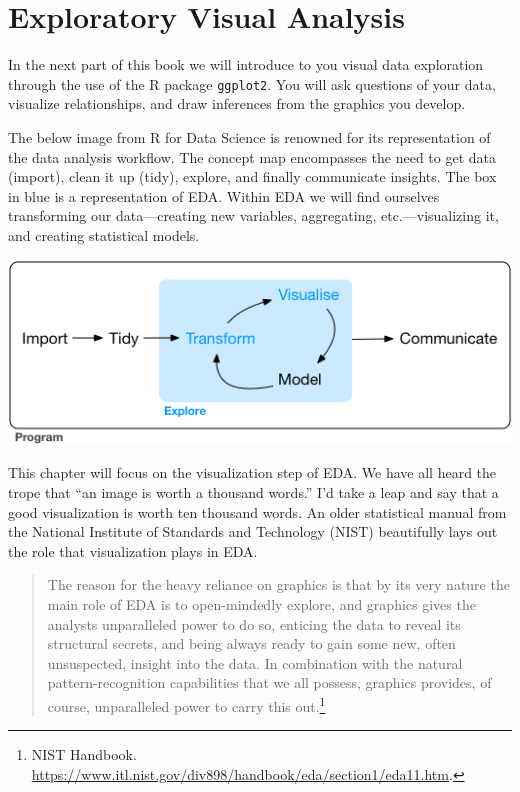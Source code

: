 \documentclass[
]{book}
\begin{document}
\hypertarget{exploratory-visual-analysis}{%
\chapter{Exploratory Visual Analysis}\label{exploratory-visual-analysis}}

In the next part of this book we will introduce to you visual data exploration through the use of the R package \texttt{ggplot2}. You will ask questions of your data, visualize relationships, and draw inferences from the graphics you develop.

The below image from R for Data Science is renowned for its representation of the data analysis workflow. The concept map encompasses the need to get data (import), clean it up (tidy), explore, and finally communicate insights. The box in blue is a representation of EDA. Within EDA we will find ourselves transforming our data---creating new variables, aggregating, etc.---visualizing it, and creating statistical models.

\includegraphics{static/data-science-explore.png}

This chapter will focus on the visualization step of EDA. We have all heard the trope that ``an image is worth a thousand words.'' I'd take a leap and say that a good visualization is worth ten thousand words. An older statistical manual from the National Institute of Standards and Technology (NIST) beautifully lays out the role that visualization plays in EDA.

\begin{quote}
The reason for the heavy reliance on graphics is that by its very nature the main role of EDA is to open-mindedly explore, and graphics gives the analysts unparalleled power to do so, enticing the data to reveal its structural secrets, and being always ready to gain some new, often unsuspected, insight into the data. In combination with the natural pattern-recognition capabilities that we all possess, graphics provides, of course, unparalleled power to carry this out.\footnote{NIST Handbook. \url{https://www.itl.nist.gov/div898/handbook/eda/section1/eda11.htm}.}
\end{quote}
\end{document}
